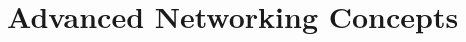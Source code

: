 \newpage
\section{Advanced Networking Concepts}
\label{Advanced Networking Concepts}
\begin{NexMainBox}
	\begin{NexMainBox}

	\end{NexMainBox}
	\begin{NexMainBox}
	\end{NexMainBox}
\end{NexMainBox}

